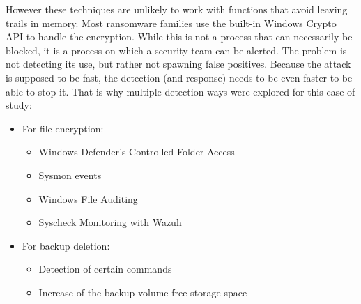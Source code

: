 However these techniques are unlikely to work with functions that avoid leaving trails in memory\cite{ransomware_oReilly}.
\linej
\linej
Most ransomware families use the built-in Windows Crypto API to handle the encryption.
While this is not a process that can necessarily be blocked, it is a process on which a security team can be alerted.
The problem is not detecting its use, but rather not spawning false positives\cite{ransomware_oReilly}.
\linej
\linej
Because the attack is supposed to be fast, the detection (and response) needs to be even faster to be able to stop it.
That is why multiple detection ways were explored for this case of study:
\begin{itemize}
\item For file encryption:
	\begin{itemize}
		\item Windows Defender's Controlled Folder Access
		\item Sysmon events
		\item Windows File Auditing
		\item Syscheck Monitoring with Wazuh
	\end{itemize}
\item For backup deletion:
	\begin{itemize}
		\item Detection of certain commands
		\item Increase of the backup volume free storage space
	\end{itemize}
\end{itemize}

